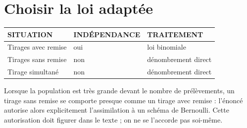 \section{Choisir la loi adaptée}

\begin{propriete}
\begin{center}
\setlength{\tabcolsep}{8pt}
\renewcommand{\arraystretch}{1.3}
\begin{tabular}{@{}lll@{}}
\toprule
\textsf{\footnotesize\bfseries SITUATION} &
\textsf{\footnotesize\bfseries INDÉPENDANCE} &
\textsf{\footnotesize\bfseries TRAITEMENT} \\
\midrule
Tirages avec remise & oui & loi binomiale \\
Tirages sans remise & non & dénombrement direct \\
Tirage simultané & non & dénombrement direct \\
\bottomrule
\end{tabular}
\end{center}
\end{propriete}

\begin{remarque}
Lorsque la population est très grande devant le nombre de prélèvements, un
tirage sans remise se comporte presque comme un tirage avec remise : l'énoncé
autorise alors explicitement l'assimilation à un schéma de Bernoulli. Cette
autorisation doit figurer dans le texte ; on ne se l'accorde pas soi-même.
\end{remarque}

